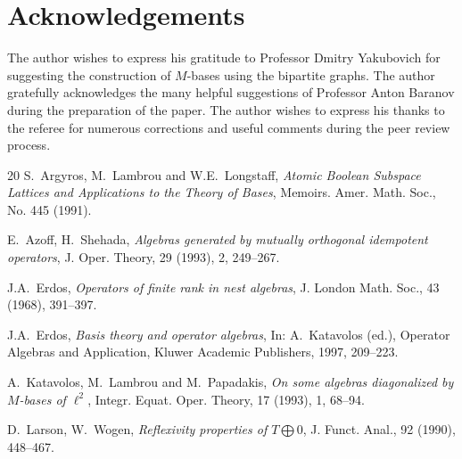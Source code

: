 \documentclass[12pt,oneside,a4paper]{amsart}
\begin{document}
  \bigskip
  \section{Acknowledgements}
    The author wishes to express his gratitude to Professor Dmitry Yakubovich for suggesting
      the construction of $M$-bases using the bipartite graphs.
    The author gratefully acknowledges the many helpful suggestions of
      Professor Anton Baranov during the preparation of the paper.
    The author wishes to express his thanks to the referee for numerous corrections and useful comments during
      the peer review process.

\begin {thebibliography}{20}
    S.~\!Argyros, M.~\!Lambrou and W.E.~\!Longstaff,
    \emph{Atomic Boolean Subspace Lattices and Applications to the Theory of Bases},
    Memoirs. Amer. Math. Soc., No. 445 (1991).

    E.~\!Azoff, H.~\!Shehada,
    \emph{Algebras generated by mutually orthogonal idempotent operators},
    J. Oper. Theory, 29 (1993), 2, 249--267.




    J.A.~\!Erdos,
    \emph{Operators of finite rank in nest algebras},
    J. London Math. Soc., 43 (1968), 391--397.

    J.A.~\!Erdos,
    \emph{Basis theory and operator algebras},
    In: A.~\!Katavolos (ed.), Operator Algebras and Application, Kluwer Academic Publishers, 1997, 209--223.

    A.~\!Katavolos, M.~\!Lambrou and M.~\!Papadakis,
    \emph{On some algebras diagonalized by $M$-bases of $\ell^2$},
    Integr. Equat. Oper. Theory, 17 (1993), 1, 68--94.

    D.~\!Larson, W.~\!Wogen,
    \emph{Reflexivity properties of $T\bigoplus0$},
    J. Funct. Anal., 92 (1990), 448--467.


\end{thebibliography}
\end{document}
